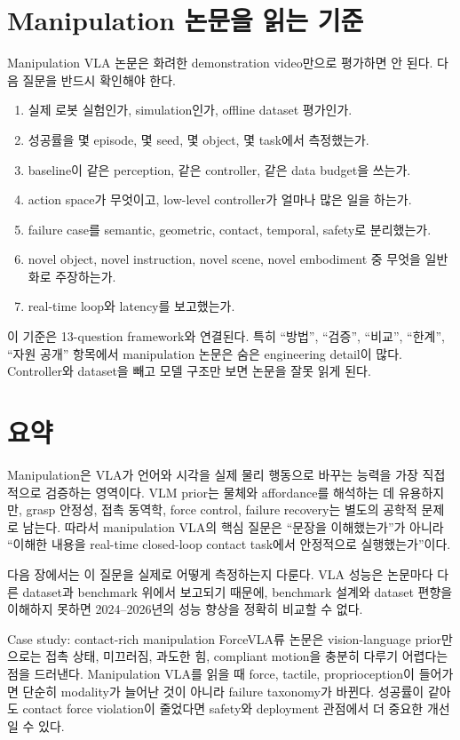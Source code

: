 \section{Manipulation 논문을 읽는 기준}

Manipulation VLA 논문은 화려한 demonstration video만으로 평가하면 안 된다. 다음 질문을 반드시 확인해야 한다.

\begin{enumerate}
  \item 실제 로봇 실험인가, simulation인가, offline dataset 평가인가.
  \item 성공률을 몇 episode, 몇 seed, 몇 object, 몇 task에서 측정했는가.
  \item baseline이 같은 perception, 같은 controller, 같은 data budget을 쓰는가.
  \item action space가 무엇이고, low-level controller가 얼마나 많은 일을 하는가.
  \item failure case를 semantic, geometric, contact, temporal, safety로 분리했는가.
  \item novel object, novel instruction, novel scene, novel embodiment 중 무엇을 일반화로 주장하는가.
  \item real-time loop와 latency를 보고했는가.
\end{enumerate}

이 기준은 13-question framework와 연결된다. 특히 ``방법'', ``검증'', ``비교'', ``한계'', ``자원 공개'' 항목에서 manipulation 논문은 숨은 engineering detail이 많다. Controller와 dataset을 빼고 모델 구조만 보면 논문을 잘못 읽게 된다.

\section{요약}

Manipulation은 VLA가 언어와 시각을 실제 물리 행동으로 바꾸는 능력을 가장 직접적으로 검증하는 영역이다. VLM prior는 물체와 affordance를 해석하는 데 유용하지만, grasp 안정성, 접촉 동역학, force control, failure recovery는 별도의 공학적 문제로 남는다. 따라서 manipulation VLA의 핵심 질문은 ``문장을 이해했는가''가 아니라 ``이해한 내용을 real-time closed-loop contact task에서 안정적으로 실행했는가''이다.

다음 장에서는 이 질문을 실제로 어떻게 측정하는지 다룬다. VLA 성능은 논문마다 다른 dataset과 benchmark 위에서 보고되기 때문에, benchmark 설계와 dataset 편향을 이해하지 못하면 2024--2026년의 성능 향상을 정확히 비교할 수 없다.

\begin{casebox}{Case study: contact-rich manipulation}
ForceVLA류 논문은 vision-language prior만으로는 접촉 상태, 미끄러짐, 과도한 힘, compliant motion을 충분히 다루기 어렵다는 점을 드러낸다. Manipulation VLA를 읽을 때 force, tactile, proprioception이 들어가면 단순히 modality가 늘어난 것이 아니라 failure taxonomy가 바뀐다. 성공률이 같아도 contact force violation이 줄었다면 safety와 deployment 관점에서 더 중요한 개선일 수 있다.
\end{casebox}

